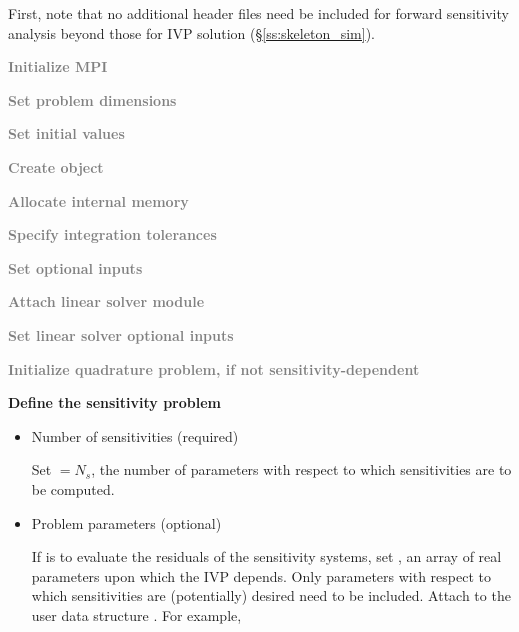 First, note that no additional header files need be included for forward sensitivity 
analysis beyond those for IVP solution (\S\ref{ss:skeleton_sim}).
\begin{Steps}
  
\item 
  \textcolor{gray}{\bf {\p} Initialize MPI}

\item
  \textcolor{gray}{\bf Set problem dimensions}

\item
  \textcolor{gray}{\bf Set initial values}
 
\item
  \textcolor{gray}{\bf Create {\idas} object}

\item
  \textcolor{gray}{\bf Allocate internal memory}

\item
  \textcolor{gray}{\bf Specify integration tolerances}

\item
  \textcolor{gray}{\bf Set optional inputs}

\item
  \textcolor{gray}{\bf Attach linear solver module}

\item
  \textcolor{gray}{\bf Set linear solver optional inputs}

\item
  \textcolor{gray}{\bf Initialize quadrature problem, if not sensitivity-dependent}

\item \label{i:fwd_start}
  {\bf Define the sensitivity problem}

  \begin{itemize}

    \item Number of sensitivities (required)

      Set  $= N_s$, the number of parameters with respect to which sensitivities
      are to be computed.
  
    \item Problem parameters (optional)

      If {\idas} is to evaluate the residuals of the sensitivity 
      systems, set , an array of  real parameters upon which the IVP 
      depends. Only parameters with respect to which sensitivities are (potentially) 
      desired need to be included. 
      Attach  to the user data structure . 
      For example, 


\end{itemize}
\end{Steps}
